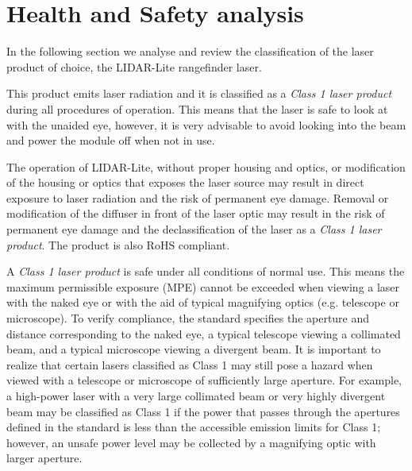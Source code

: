 \clearpage
\section{Health and Safety analysis}

In the following section we analyse and review the classification of the laser product of choice, the LIDAR-Lite rangefinder laser. 

This product emits laser radiation and it is classified as a \textit{Class 1 laser product} during all procedures of operation. This means that the laser is safe to look at with the unaided eye, however, it is very advisable to avoid looking into the beam and power the module off when not in use\cite{laserclass}.

The operation of LIDAR-Lite, without proper housing and optics, or modification of the housing or optics that exposes the laser source may result in direct exposure to laser radiation and the risk of permanent eye damage. Removal or modification of the diffuser in front of the laser optic may result in the risk of permanent eye damage and the declassification of the laser as a \textit{Class 1 laser product}. The product is also RoHS compliant\cite{laserrohs}.

A \textit{Class 1 laser product} is safe under all conditions of normal use. This means the maximum permissible exposure (MPE) cannot be exceeded when viewing a laser with the naked eye or with the aid of typical magnifying optics (e.g. telescope or microscope). To verify compliance, the standard specifies the aperture and distance corresponding to the naked eye, a typical telescope viewing a collimated beam, and a typical microscope viewing a divergent beam. It is important to realize that certain lasers classified as Class 1 may still pose a hazard when viewed with a telescope or microscope of sufficiently large aperture. For example, a high-power laser with a very large collimated beam or very highly divergent beam may be classified as Class 1 if the power that passes through the apertures defined in the standard is less than the accessible emission limits for Class 1; however, an unsafe power level may be collected by a magnifying optic with larger aperture\cite{laserclass2}.